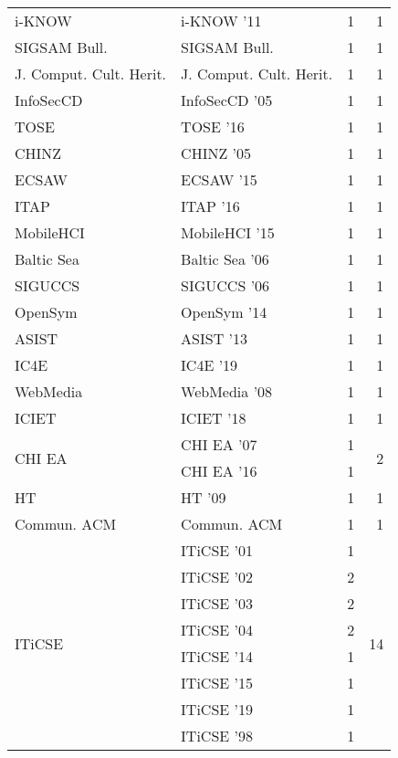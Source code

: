 \begin{table*}[t]
\begin{tabular}{llrr}
\multirow{1}{*}{i-KNOW } & i-KNOW '11 & 1 & \multirow{1}{*}{1}\\
\multirow{1}{*}{SIGSAM Bull.} & SIGSAM Bull. & 1 & \multirow{1}{*}{1}\\
\multirow{1}{*}{J. Comput. Cult. Herit.} & J. Comput. Cult. Herit. & 1 & \multirow{1}{*}{1}\\
\multirow{1}{*}{InfoSecCD } & InfoSecCD '05 & 1 & \multirow{1}{*}{1}\\
\multirow{1}{*}{TOSE } & TOSE '16 & 1 & \multirow{1}{*}{1}\\
\multirow{1}{*}{CHINZ } & CHINZ '05 & 1 & \multirow{1}{*}{1}\\
\multirow{1}{*}{ECSAW } & ECSAW '15 & 1 & \multirow{1}{*}{1}\\
\multirow{1}{*}{ITAP } & ITAP '16 & 1 & \multirow{1}{*}{1}\\
\multirow{1}{*}{MobileHCI } & MobileHCI '15 & 1 & \multirow{1}{*}{1}\\
\multirow{1}{*}{Baltic Sea } & Baltic Sea '06 & 1 & \multirow{1}{*}{1}\\
\multirow{1}{*}{SIGUCCS } & SIGUCCS '06 & 1 & \multirow{1}{*}{1}\\
\multirow{1}{*}{OpenSym } & OpenSym '14 & 1 & \multirow{1}{*}{1}\\
\multirow{1}{*}{ASIST } & ASIST '13 & 1 & \multirow{1}{*}{1}\\
\multirow{1}{*}{IC4E } & IC4E '19 & 1 & \multirow{1}{*}{1}\\
\multirow{1}{*}{WebMedia } & WebMedia '08 & 1 & \multirow{1}{*}{1}\\
\multirow{1}{*}{ICIET } & ICIET '18 & 1 & \multirow{1}{*}{1}\\
\multirow{2}{*}{CHI EA } & CHI EA '07 & 1 & \multirow{2}{*}{2}\\
& CHI EA '16 & 1 &\\
\multirow{1}{*}{HT } & HT '09 & 1 & \multirow{1}{*}{1}\\
\multirow{1}{*}{Commun. ACM} & Commun. ACM & 1 & \multirow{1}{*}{1}\\
\multirow{9}{*}{ITiCSE } & ITiCSE '01 & 1 & \multirow{9}{*}{14}\\
& ITiCSE '02 & 2 &\\
& ITiCSE '03 & 2 &\\
& ITiCSE '04 & 2 &\\
& ITiCSE '14 & 1 &\\
& ITiCSE '15 & 1 &\\
& ITiCSE '19 & 1 &\\
& ITiCSE '98 & 1 &\\

\end{tabular}
\end{table*}
